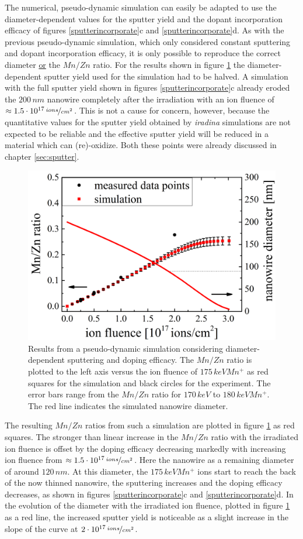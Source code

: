 The numerical, pseudo-dynamic simulation can easily be adapted to use the diameter-dependent values for the sputter yield and the dopant incorporation efficacy of figures \ref{sputterincorporate}c and \ref{sputterincorporate}d. As with the previous pseudo-dynamic simulation, which only considered constant sputtering and dopant incorporation efficacy, it is only possible to reproduce the correct diameter \underline{or} the $Mn/Zn$ ratio. For the results shown in figure \ref{pseudodynamic} the diameter-dependent sputter yield used for the simulation had to be halved. A simulation with the full sputter yield shown in figures \ref{sputterincorporate}c already eroded the $200\,nm$ nanowire completely after the irradiation with an ion fluence of $\approx 1.5\cdot 10^{17}\,\nicefrac{ions}{cm^2}$. This is not a cause for concern, however, because the quantitative values for the sputter yield obtained by \emph{iradina} simulations are not expected to be reliable and the effective sputter yield will be reduced in a material which can (re)-oxidize. Both these points were already discussed in chapter \ref{sec:sputter}.

\begin{figure}
	\centering
		\includegraphics[width=.5\textwidth]{images/pseudodynamic.png}
	\caption{Results from a pseudo-dynamic simulation considering diameter-dependent sputtering and doping efficacy. The $Mn/Zn$ ratio is plotted to the left axis versus the ion fluence of $175\,keV Mn^+$ as red squares for the simulation and black circles for the experiment. The error bars range from the $Mn/Zn$ ratio for $170\,keV$ to $180\,keV Mn^+$. The red line indicates the simulated nanowire diameter.}
	\label{pseudodynamic}
\end{figure} 

The resulting $Mn/Zn$ ratios from such a simulation are plotted in figure \ref{pseudodynamic} as red squares. The stronger than linear increase in the $Mn/Zn$ ratio with the irradiated ion fluence is offset by the doping efficacy decreasing markedly with increasing ion fluence from $\approx 1.5\cdot 10^{17}\,\nicefrac{ions}{cm^2}$. Here the nanowire as a remaining diameter of around $120\,nm$. At this diameter, the $175\,keV Mn^+$ ions start to reach the back of the now thinned nanowire, the sputtering increases and the doping efficacy decreases, as shown in figures \ref{sputterincorporate}c and \ref{sputterincorporate}d. In the evolution of the diameter with the irradiated ion fluence, plotted in figure \ref{pseudodynamic} as a red line, the increased sputter yield is noticeable as a slight increase in the slope of the curve at $2\cdot 10^{17}\,\nicefrac{ions}{cm^2}$. 

